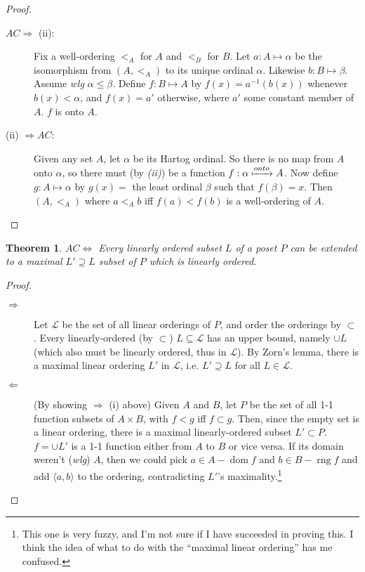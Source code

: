 \documentclass[12pt]{article}
\DeclareMathOperator{\rng}{rng}
\DeclareMathOperator{\dom}{dom}
\newtheorem*{theorem*}{Theorem}
\begin{document}
\begin{description}
\begin{proof}
\begin{description}
 \item[$AC \Rightarrow$ (ii):] Fix a well-ordering $<_A$ for $A$ and
 $<_B$ for $B$.  Let $a: A \mapsto \alpha$ be the isomorphism from
 $(A,<_A)$ to its unique ordinal $\alpha$.  Likewise $b: B \mapsto
 \beta$.  Assume \textit{wlg} $\alpha \le \beta$.  Define $f: B \mapsto
 A$ by $f(x) = a^{-1}(b(x))$ whenever $b(x) < \alpha$, and $f(x) = a'$
 otherwise, where $a'$ some constant member of $A$.  $f$ is onto $A$.
 
 \item[(ii) $\Rightarrow AC$:] Given any set $A$, let $\alpha$ be its
 Hartog ordinal.  So there is no map from $A$ onto $\alpha$, so there
 must (by \textit{(ii)}) be a function $f: \alpha \xmapsto{onto} A$.
 Now define $g: A \mapsto \alpha$ by $g(x) = $ the least ordinal $\beta$
 such that $f(\beta) = x$.  Then $(A,<_A)$ where $a <_A b$ iff $f(a) <
 f(b)$ is a well-ordering of $A$.
 \end{description}
\end{proof}

\begin{theorem*}
  $AC \Leftrightarrow$ Every linearly ordered subset $L$ of a poset $P$
  can be extended to a maximal $L' \supseteq L$ subset of $P$ which is
  linearly ordered.
\end{theorem*}

\begin{proof}
\begin{description}
\item[$\Rightarrow$] Let $\mathscr{L}$ be the set of all linear
orderings of $P$, and order the orderings by $\subset$.  Every
linearly-ordered (by $\subset$) $L \subseteq \mathscr{L}$ has an upper
bound, namely $\cup L$ (which also must be linearly ordered, thus in
$\mathscr{L}$).  By Zorn's lemma, there is a maximal linear ordering
$L'$ in $\mathscr{L}$, i.e. $L' \supseteq L$ for all $L \in \mathscr{L}$.
\item[$\Leftarrow$] (By showing $\Rightarrow$ (i) above)  Given $A$ and
$B$, let $P$ be the set of all 1-1 function subsets of $A \times B$,
with $f < g$ iff $f \subset g$.  Then, since the empty set is a linear
ordering, there is a maximal linearly-ordered subset $L' \subset P$.
$f = \cup L'$ is a 1-1 function either from $A$ to $B$ or vice versa.  If
its domain weren't (\textit{wlg}) $A$, then we could pick $a \in A -
\dom f$ and $b \in B - \rng f$ and add $\langle a,b \rangle$ to the
ordering, contradicting $L'$'s maximality.\footnote{This one is very
fuzzy, and I'm not sure if I have succeeded in proving this.  I think
the idea of what to do with the ``maximal linear ordering'' has me
confused.}
\end{description}
\end{proof}



\end{description}
\end{document}
